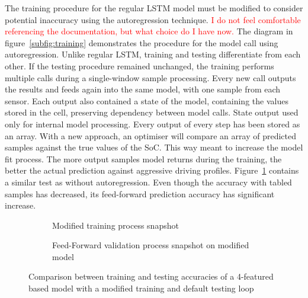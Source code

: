 %
%
The training procedure for the regular LSTM model must be modified to consider potential inaccuracy using the autoregression technique.
\textcolor{red}{I do not feel comfortable referencing the documentation, but what choice do I have now.}
The diagram in figure~\ref{subfig:training} demonstrates the procedure for the model call using autoregression.
Unlike regular LSTM, training and testing differentiate from each other.
If the testing procedure remained unchanged, the training performs multiple calls during a single-window sample processing.
Every new call outputs the results and feeds again into the same model, with one sample from each sensor.
Each output also contained a state of the model, containing the values stored in the cell, preserving dependency between model calls.
State output used only for internal model processing.
Every output of every step has been stored as an array.
With a new approach, an optimiser will compare an array of predicted samples against the true values of the SoC.
This way meant to increase the model fit process.
The more output samples model returns during the training, the better the actual prediction against aggressive driving profiles.
Figure~\ref{fig:modefied_tr} contains a similar test as without autoregression.
Even though the accuracy with tabled samples has decreased, its feed-forward prediction accuracy has significant increase.
\begin{figure}[htbp]
    \centering
    \begin{subfigure}[b]{0.45\textwidth}
        \centering
        
        \caption{Modified training process snapshot}
    \end{subfigure}
    \begin{subfigure}[b]{0.45\textwidth}
        \centering
        
        \caption{Feed-Forward validation process snapshot on modified model}
    \end{subfigure}
    \caption{Comparison between training and testing accuracies of a 4-featured based model with a modified training and default testing loop}
    \label{fig:modefied_tr}
\end{figure}